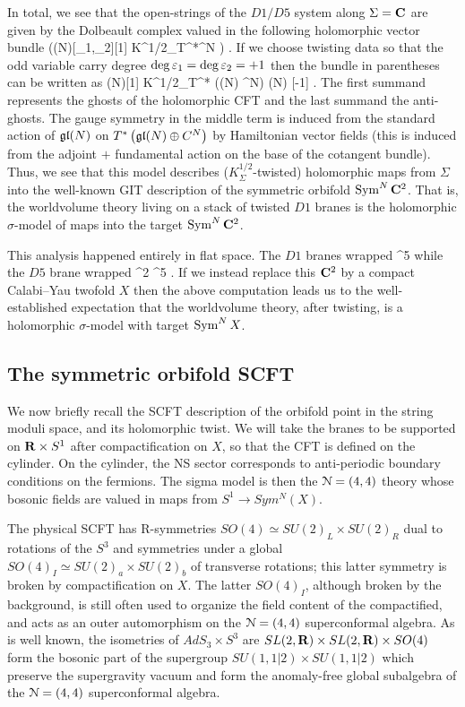 \documentclass[../main.tex]{subfiles}
\begin{document}
In total, we see that the open-strings of the $D1/D5$ system along $\Sigma = \mathbf{C}$ are given by the Dolbeault complex valued in the following holomorphic vector bundle
\beqn
\bigg((N)[\ep_1,\ep_2][1] \oplus K^{1/2}_\C \otimes T^*\C^N \bigg) \otimes \C[\ep_3,\ep_4] .
\eeqn
If we choose twisting data so that the odd variable carry degree $\deg{\varepsilon_1}=\deg{\varepsilon_2} = +1$ then the bundle in parentheses can be written as
\beqn
{}(N)[1] \oplus K^{1/2}_\Sigma \otimes T^* \left((N) \oplus  \C^N\right) \oplus {}(N) [-1] .
\eeqn
The first summand represents the ghosts of the holomorphic CFT and the last summand the anti-ghosts.
The gauge symmetry in the middle term is induced from the standard 
action of $\mathfrak{gl}(N)$ on $T^* \left(\mathfrak{gl}(N) \oplus C^N\right)$ by Hamiltonian vector fields (this is induced from the adjoint $+$ fundamental action on the base of the cotangent bundle). 
Thus, we see that this model describes ($K^{1/2}_\Sigma$-twisted) holomorphic maps from $\Sigma$ into the well-known GIT description of the symmetric orbifold $\operatorname{Sym}^{N} \mathbf{C}^2$.
That is, the worldvolume theory living on a stack of twisted $D1$ branes is the holomorphic $\sigma$-model of maps into the target $\operatorname{Sym}^N \mathbf{C}^2$.

This analysis happened entirely in flat space.
The $D1$ branes wrapped
\beqn
\C {}    \subset \C^5
\eeqn
while the $D5$ brane wrapped
\beqn
\C \times \C^2   \subset \C^5 .
\eeqn
If we instead replace this $\mathbf{C}^2$ by a compact Calabi--Yau twofold $X$ then the above computation leads us to the well-established expectation that the worldvolume theory, after twisting, is a holomorphic $\sigma$-model with target $\operatorname{Sym}^N X$.


\subsection{The symmetric orbifold SCFT}

We now briefly recall the SCFT description of the orbifold point in the string moduli space, and its holomorphic twist. We will take the branes to be supported on $\mathbf{R} \times S^1$ after compactification on $X$, so that the CFT is defined on the cylinder. On the cylinder, the NS sector corresponds to anti-periodic boundary conditions on the fermions. The sigma model is then the $\mathcal N = (4,4)$ theory whose bosonic fields are valued in maps from $S^1 \rightarrow Sym^N(X)$.  

The physical SCFT has R-symmetries $SO(4) \simeq SU(2)_L \times SU(2)_R$ dual to rotations of the $S^3$ and symmetries under a global $SO(4)_I \simeq SU(2)_a \times SU(2)_b$ of transverse rotations; this latter symmetry is broken by compactification on $X$. The latter $SO(4)_I$, although broken by the background, is still often used to organize the field content of the compactified, and acts as an outer automorphism on the $\mathcal N=(4, 4)$ superconformal algebra. As is well known, the isometries of $AdS_3 \times S^3$ are $SL(2, \mathbf{R}) \times SL(2, \mathbf{R}) \times SO(4)$ form the bosonic part of the supergroup $SU(1,1|2) \times SU(1,1|2)$ which preserve the supergravity vacuum and form the anomaly-free global subalgebra of the $\mathcal N= (4,4)$ superconformal algebra.
\end{document}
